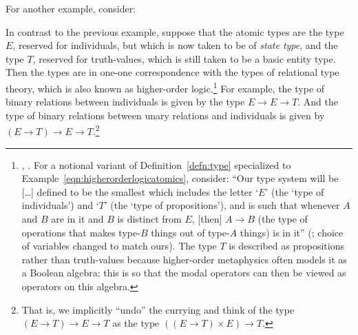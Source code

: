 \documentclass{lmcs} %
\begin{document}
For another example, consider:
\begin{exa}\label{eqn:higherorderlogicatomics}
In contrast to the previous example, suppose that the atomic types are the type $E$, reserved for individuals, but which is now taken to be of \emph{state type}, and the type $T$, reserved for truth-values, which is still taken to be a basic entity type. Then the types are in one-one correspondence with the types of relational type theory, which is also known as higher-order logic.\footnote{\cite[73]{Orey1959-zk}, \cite[68]{Gallin1975-tp}. For a notional variant of Definition~\ref{defn:type} specialized to Example~\ref{eqn:higherorderlogicatomics}, consider: ``Our type system will be [\ldots] defined to be the smallest which includes the letter `$E$' (the `type of individuals') and `$T$' (the `type of propositions'), and is such that whenever $A$ and $B$ are in it and $B$ is distinct from $E$, [then] $A\rightarrow B$ (the type of operations that makes type-$B$ things out of type-$A$ things) is in it'' (\cite[112]{Fritz2024-wo}; choice of variables changed to match ours). The type $T$ is described as propositions rather than truth-values because higher-order metaphysics often models it as a Boolean algebra; this is so that the modal operators can then be viewed as operators on this algebra.}
For example, the type of binary relations between individuals is given by the type $E\rightarrow E\rightarrow T$. And the type of binary relations between unary relations and individuals is given by $(E\rightarrow T)\rightarrow E\rightarrow T$.\footnote{That is, we implicitly ``undo'' the currying and think of the type $(E\rightarrow T)\rightarrow E\rightarrow T$ as the type $((E\rightarrow T)\times E)\rightarrow T$.} 
\end{exa}
\end{document}
